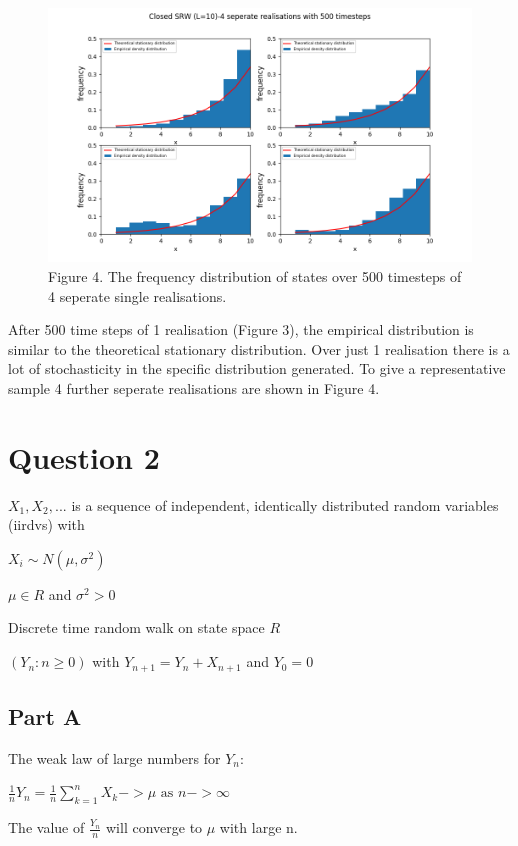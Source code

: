 \documentclass{article}
\begin{document}
\begin{figure}[H]
\includegraphics[scale=0.5]{500_steps_b.png} 
\small{Figure 4. The frequency distribution of states over 500 timesteps of 4 seperate single realisations. }
\end{figure}

After 500 time steps of 1 realisation (Figure 3), the empirical distribution is similar to the theoretical stationary distribution. Over just 1 realisation there is a lot of stochasticity in the specific distribution generated. To give a representative sample 4 further seperate realisations are shown in Figure 4.


\section{Question 2}

$X_1, X_2, ... $ is a sequence of independent, identically distributed random variables (iirdvs) with 

$X_i \sim N(\mu, \sigma^2)$ 

$\mu \in {R}$ and $\sigma^2 > 0$

Discrete time random walk on state space ${R}$

$(Y_n : n \geq 0)$ with $Y_{n+1} = Y_n + X_{n+1}$ and $Y_0 = 0$


\subsection{Part A}

The weak law of large numbers for $Y_n$:

$\frac{1}{n}Y_n = \frac{1}{n}\sum\limits_{k=1}^n X_k -> \mu \text{ as } n -> \infty$

The value of $\frac{Y_n}{n}$ will converge to $\mu$ with large n.
\end{document}
